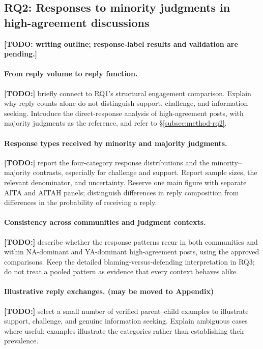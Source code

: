 \subsection{RQ2: Responses to minority judgments in high-agreement discussions}
\label{subsec:res-rq2}

\textbf{[TODO: writing outline; response-label results and validation are
pending.]}

\paragraph{From reply volume to reply function.}
\textbf{[TODO:]} briefly connect to RQ1's structural engagement comparison.
Explain why reply counts alone do not distinguish support, challenge, and
information seeking. Introduce the direct-response analysis of high-agreement
posts, with majority judgments as the reference, and refer to
\S\ref{subsec:method-rq2}.

\paragraph{Response types received by minority and majority judgments.}
\textbf{[TODO:]} report the four-category response distributions and the
minority--majority contrasts, especially for challenge and support. Report
sample sizes, the relevant denominator, and uncertainty. Reserve one main
figure with separate AITA and AITAH panels; distinguish differences in reply
composition from differences in the probability of receiving a reply.

\paragraph{Consistency across communities and judgment contexts.}
\textbf{[TODO:]} describe whether the response patterns recur in both communities
and within NA-dominant and YA-dominant high-agreement posts, using the approved
comparisons. Keep the detailed blaming-versus-defending interpretation in RQ3;
do not treat a pooled pattern as evidence that every context behaves alike.

\paragraph{Illustrative reply exchanges. (may be moved to Appendix)}
\textbf{[TODO:]} select a small number of verified parent--child examples to
illustrate support, challenge, and genuine information seeking. Explain
ambiguous cases where useful; examples illustrate the categories rather than
establishing their prevalence.

